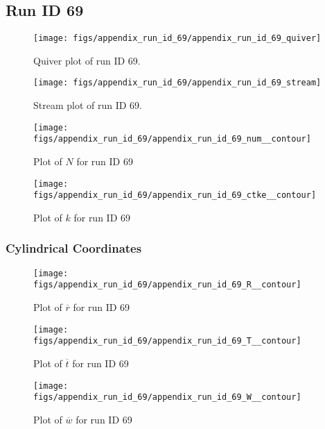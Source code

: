 \subsection{Run ID 69}
\begin{figure}[H]
\centering
\texttt{[image: figs/appendix\_run\_id\_69/appendix\_run\_id\_69\_quiver]}
\caption{Quiver plot of run ID 69.}
\label{fig:appendix_run_id_69_quiver}
\end{figure}


\begin{figure}[H]
\centering
\texttt{[image: figs/appendix\_run\_id\_69/appendix\_run\_id\_69\_stream]}
\caption{Stream plot of run ID 69.}
\label{fig:appendix_run_id_69_stream}
\end{figure}


\begin{figure}[H]
\centering
\texttt{[image: figs/appendix\_run\_id\_69/appendix\_run\_id\_69\_num\_\_contour]}
\caption{Plot of $N$ for run ID 69}
\label{fig:appendix_run_id_69_num__contour}
\end{figure}


\begin{figure}[H]
\centering
\texttt{[image: figs/appendix\_run\_id\_69/appendix\_run\_id\_69\_ctke\_\_contour]}
\caption{Plot of $k$ for run ID 69}
\label{fig:appendix_run_id_69_ctke__contour}
\end{figure}


\subsubsection{Cylindrical Coordinates}
\begin{figure}[H]
\centering
\texttt{[image: figs/appendix\_run\_id\_69/appendix\_run\_id\_69\_R\_\_contour]}
\caption{Plot of $\overline{r}$ for run ID 69}
\label{fig:appendix_run_id_69_R__contour}
\end{figure}


\begin{figure}[H]
\centering
\texttt{[image: figs/appendix\_run\_id\_69/appendix\_run\_id\_69\_T\_\_contour]}
\caption{Plot of $\overline{t}$ for run ID 69}
\label{fig:appendix_run_id_69_T__contour}
\end{figure}


\begin{figure}[H]
\centering
\texttt{[image: figs/appendix\_run\_id\_69/appendix\_run\_id\_69\_W\_\_contour]}
\caption{Plot of $\overline{w}$ for run ID 69}
\label{fig:appendix_run_id_69_W__contour}
\end{figure}


